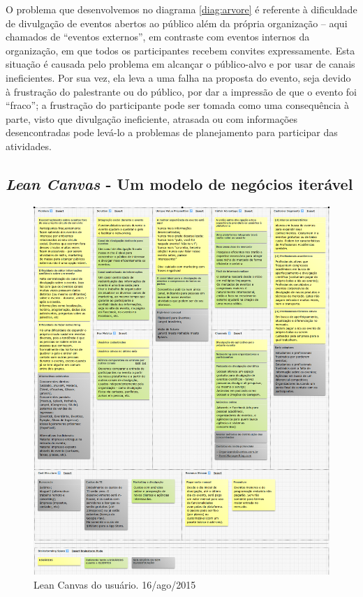 \documentclass[12pt,a4paper,twoside,hyphens,english,brazil]{abntex2}
\begin{document}
O problema que desenvolvemos no diagrama \ref{diag:arvore} é referente à dificuldade de divulgação de eventos abertos ao público além da própria organização -- aqui chamados de ``eventos externos'', em contraste com eventos internos da organização, em que todos os participantes recebem convites expressamente. Esta situação é causada pelo problema em alcançar o público-alvo e por usar de canais ineficientes. Por sua vez, ela leva a uma falha na proposta do evento, seja devido à frustração do palestrante ou do público, por dar a impressão de que o evento foi ``fraco''; a frustração do participante pode ser tomada como uma consequência à parte, visto que divulgação ineficiente, atrasada ou com informações desencontradas pode levá-lo a problemas de planejamento para participar das atividades.


\subsection{\emph{Lean Canvas} - Um modelo de negócios iterável}

\begin{figure}[!bp]
	\centering
	\includegraphics[width=1\linewidth]{imagens/canvas-usuarios.png}
	\caption{Lean Canvas do usuário. 16/ago/2015}
\end{figure}
\end{document}
